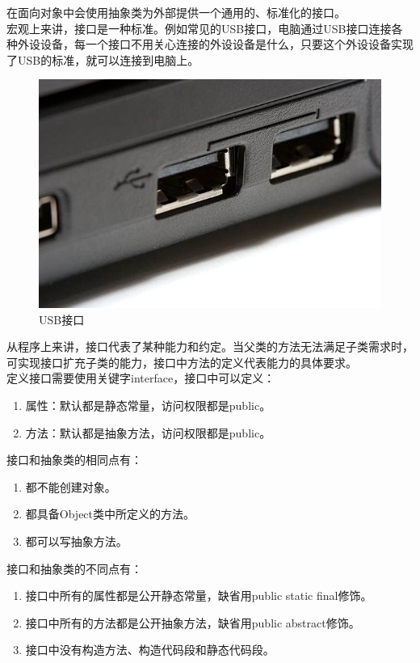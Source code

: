 在面向对象中会使用抽象类为外部提供一个通用的、标准化的接口。 \\

宏观上来讲，接口是一种标准。例如常见的USB接口，电脑通过USB接口连接各种外设设备，每一个接口不用关心连接的外设设备是什么，只要这个外设设备实现了USB的标准，就可以连接到电脑上。

\begin{figure}[H]
	\centering
	\includegraphics[scale=0.4]{img/C9/9-4/1.png}
	\caption{USB接口}
\end{figure}

从程序上来讲，接口代表了某种能力和约定。当父类的方法无法满足子类需求时，可实现接口扩充子类的能力，接口中方法的定义代表能力的具体要求。 \\

定义接口需要使用关键字interface，接口中可以定义：

\begin{enumerate}
	\item 属性：默认都是静态常量，访问权限都是public。
	\item 方法：默认都是抽象方法，访问权限都是public。
\end{enumerate}

接口和抽象类的相同点有：

\begin{enumerate}
	\item 都不能创建对象。
	\item 都具备Object类中所定义的方法。
	\item 都可以写抽象方法。
\end{enumerate}

接口和抽象类的不同点有：

\begin{enumerate}
	\item 接口中所有的属性都是公开静态常量，缺省用public static final修饰。
	\item 接口中所有的方法都是公开抽象方法，缺省用public abstract修饰。
	\item 接口中没有构造方法、构造代码段和静态代码段。
\end{enumerate}

